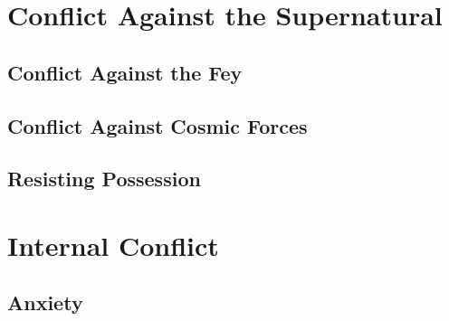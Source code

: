 \documentclass[twocolumn]{dndbook}
\begin{document}
\chapter{Conflict Against the Supernatural}
\section{Conflict Against the Fey}

\section{Conflict Against Cosmic Forces}

\section{Resisting Possession}



\chapter{Internal Conflict}
\section{Anxiety}
\end{document}
